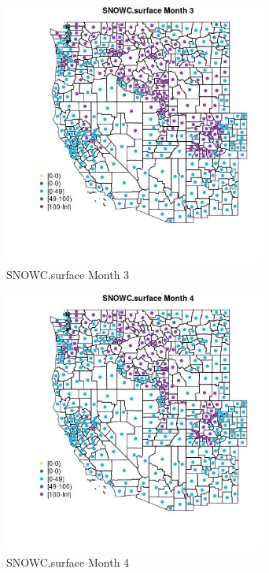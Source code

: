 \begin{figure} 
\centering  
\includegraphics[width=0.77\textwidth]{Code_Outputs/df_report_ML_predictors_CountyCentroid_Locations_Dates_2008-01-01to2018-12-31_MapObsMo3SNOWCsurface.jpg} 
\caption{\label{fig:df_report_ML_predictors_CountyCentroid_Locations_Dates_2008-01-01to2018-12-31MapObsMo3SNOWCsurface}SNOWC.surface Month 3} 
\end{figure} 
 

\begin{figure} 
\centering  
\includegraphics[width=0.77\textwidth]{Code_Outputs/df_report_ML_predictors_CountyCentroid_Locations_Dates_2008-01-01to2018-12-31_MapObsMo4SNOWCsurface.jpg} 
\caption{\label{fig:df_report_ML_predictors_CountyCentroid_Locations_Dates_2008-01-01to2018-12-31MapObsMo4SNOWCsurface}SNOWC.surface Month 4} 
\end{figure} 
 

